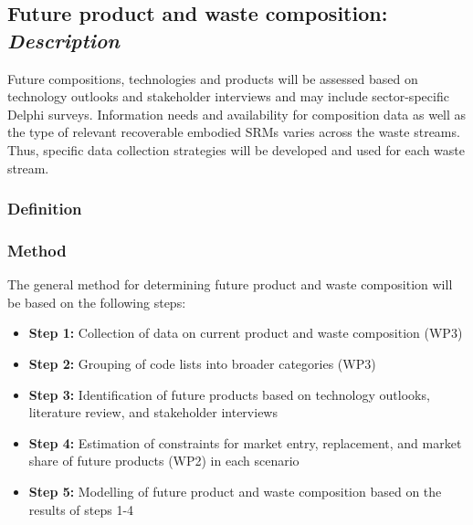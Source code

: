 \subsection{Future product and waste composition: \textit{Description}}

Future compositions, technologies and products will be assessed based on technology outlooks and stakeholder
interviews and may include sector-specific Delphi surveys. Information needs and availability for composition data
as well as the type of relevant recoverable embodied SRMs varies across the waste streams. Thus, specific data
collection strategies will be developed and used for each waste stream.


\subsubsection{Definition}




\subsubsection{Method}

The general method for determining future product and waste composition will be based on the following steps:

\begin{itemize}
    \item \textbf{Step 1:} Collection of data on current product and waste composition (WP3)
    \item \textbf{Step 2:} Grouping of code lists into broader categories (WP3)
    \item \textbf{Step 3:} Identification of future products based on technology outlooks, literature review, and stakeholder interviews
    \item \textbf{Step 4:} Estimation of constraints for market entry, replacement, and market share of future products (WP2) in each scenario
    \item \textbf{Step 5:} Modelling of future product and waste composition based on the results of steps 1-4
\end{itemize}

